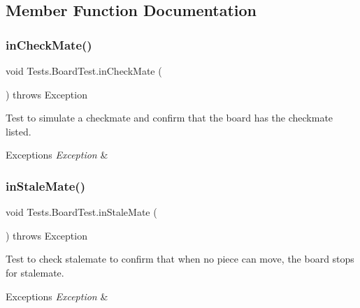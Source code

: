 \subsection{Member Function Documentation}
\hypertarget{class_tests_1_1_board_test_a39bdcd7eb309f039104f07d042d0678f}{}\label{class_tests_1_1_board_test_a39bdcd7eb309f039104f07d042d0678f} 
\subsubsection{\texorpdfstring{in\+Check\+Mate()}{inCheckMate()}}
{\footnotesize\ttfamily void Tests.\+Board\+Test.\+in\+Check\+Mate (\begin{DoxyParamCaption}{ }\end{DoxyParamCaption}) throws Exception}

Test to simulate a checkmate and confirm that the board has the checkmate listed. 
\begin{DoxyExceptions}{Exceptions}
{\em Exception} & \\
\hline
\end{DoxyExceptions}
\hypertarget{class_tests_1_1_board_test_aaa8c24159f5ef9acbb15b47ae83f8d88}{}\label{class_tests_1_1_board_test_aaa8c24159f5ef9acbb15b47ae83f8d88} 
\subsubsection{\texorpdfstring{in\+Stale\+Mate()}{inStaleMate()}}
{\footnotesize\ttfamily void Tests.\+Board\+Test.\+in\+Stale\+Mate (\begin{DoxyParamCaption}{ }\end{DoxyParamCaption}) throws Exception}

Test to check stalemate to confirm that when no piece can move, the board stops for stalemate. 
\begin{DoxyExceptions}{Exceptions}
{\em Exception} & \\
\hline
\end{DoxyExceptions}
\hypertarget{class_tests_1_1_board_test_acd51124659fb2a0eb4f6fcc9b41e8001}{}\label{class_tests_1_1_board_test_acd51124659fb2a0eb4f6fcc9b41e8001} 
